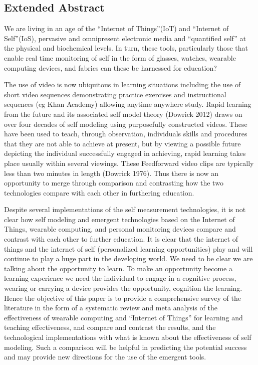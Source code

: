 \subsection{Extended Abstract}


We are living in an age of the “Internet of Things”(IoT) and “Internet of Self”(IoS), pervasive and omnipresent electronic media and “quantified self” at the physical and biochemical levels. In turn, these tools, particularly those that enable real time monitoring of self in the form of glasses, watches, wearable computing devices, and fabrics can these be harnessed for education?

The use of video is now ubiquitous in learning situations including the use of short video sequences demonstrating practice exercises and instructional sequences (eg Khan Academy) allowing anytime anywhere study. Rapid learning from the future and its associated self model theory (Dowrick 2012) draws on over four decades of self modeling using purposefully constructed videos. These have been used to teach, through observation, individuals skills and procedures that they are not able to achieve at present, but by viewing a possible future depicting the individual successfully engaged in achieving, rapid learning takes place usually within several viewings. These Feedforward video clips are typically less than two minutes in length (Dowrick 1976). Thus there is now an opportunity to merge through comparison and contrasting how the two technologies compare with each other in furthering education.

Despite several implementations of the self measurement technologies, it is not clear how self modeling and emergent technologies based on the Internet of Things, wearable computing, and personal monitoring devices compare and contrast with each other to further education. It is clear that the internet of things and the internet of self (personalized learning opportunities) play and will continue to play a huge part in the developing world. We need to be clear we are talking about the opportunity to learn. To make an opportunity become a learning experience we need the individual to engage in a cognitive process, wearing or carrying a device provides the opportunity, cognition the learning. Hence the objective of this paper is to provide a comprehensive survey of the literature in the form of a systematic review and meta analysis of the effectiveness of wearable computing and “Internet of Things” for learning and teaching effectiveness, and compare and contrast the results, and the technological implementations with what is known about the effectiveness of self modeling. Such a comparison will be helpful in predicting the potential success and may provide new directions for the use of the emergent tools.

